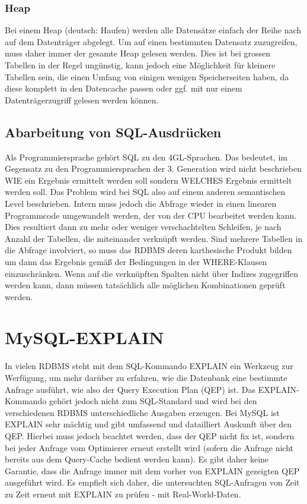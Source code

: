 \subsubsection{Heap} 
Bei einem Heap (deutsch: Haufen) werden alle Datensätze einfach der Reihe nach auf dem Datenträger abgelegt. Um auf einen bestimmten Datensatz zuzugreifen, muss daher immer der gesamte Heap gelesen werden. Dies ist bei grossen Tabellen in der Regel ungünstig, kann jedoch eine Möglichkeit für kleinere Tabellen sein, die einen Umfang von einigen wenigen Speicherseiten haben, da diese komplett in den Datencache passen oder ggf. mit nur einem Datenträgerzugriff gelesen werden können.

\subsection{Abarbeitung von SQL-Ausdrücken}
Als Programmiersprache gehört SQL zu den 4GL-Sprachen. Das bedeutet, im Gegensatz zu den Programmiersprachen der 3. Generation wird nicht beschrieben WIE ein Ergebnis ermittelt werden soll sondern WELCHES Ergebnis ermittelt werden soll. Das Problem wird bei SQL also auf einem anderen semantischen Level beschrieben. Intern muss jedoch die Abfrage wieder in einen linearen Programmcode umgewandelt werden, der von der CPU bearbeitet werden kann. Dies resultiert dann zu mehr oder weniger verschachtelten Schleifen, je nach Anzahl der Tabellen, die miteinander verknüpft werden.
Sind mehrere Tabellen in die Abfrage involviert, so muss das RDBMS deren karthesische Produkt bilden um dann das Ergebnis gemäß der Bedingungen in der WHERE-Klausen einzuschränken. Wenn auf die verknüpften Spalten nicht über Indizes zugegriffen werden kann, dann müssen tatsächlich alle möglichen Kombinationen geprüft werden.

\section{MySQL-EXPLAIN}
In vielen RDBMS steht mit dem SQL-Kommando EXPLAIN ein Werkzeug zur Werfügung, um mehr darüber zu erfahren, wie die Datenbank eine bestimmte Anfrage ausführt, wie also der Query Execution Plan (QEP) ist. Das EXPLAIN-Kommando gehört jedoch nicht zum SQL-Standard und wird bei den verschiedenen RDBMS unterschiedliche Ausgaben erzeugen. Bei MySQL ist EXPLAIN sehr mächtig und gibt umfassend und datailliert Auskunft über den QEP. Hierbei muss jedoch beachtet werden, dass der QEP nicht fix ist, sondern bei jeder Anfrage vom Optimierer erneut erstellt wird (sofern die Anfrage nicht bereits aus dem Query-Cache bedient werden kann). Es gibt daher keine Garantie, dass die Anfrage immer mit dem vorher von EXPLAIN gezeigten QEP ausgeführt wird. Es empfielt sich daher, die untersuchten SQL-Anfragen von Zeit zu Zeit erneut mit EXPLAIN zu prüfen - mit Real-World-Daten.

